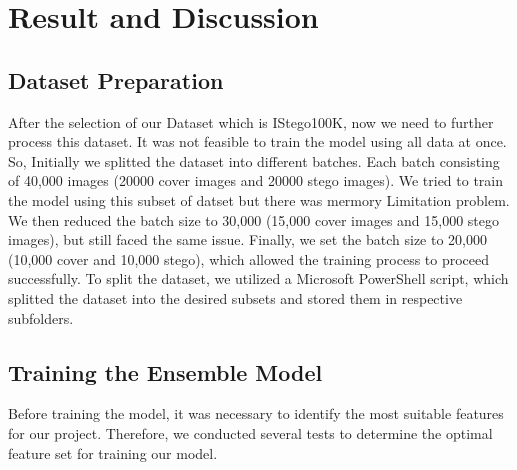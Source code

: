 \chapter{Result and Discussion}
\setcounter{secnumdepth}{4}
\section{Dataset Preparation}
After the selection of our Dataset which is IStego100K\cite{7}, now we need to further process this dataset. It was not feasible to train the model using all data at once. So, Initially we splitted the dataset into different batches. Each batch consisting of 40,000 images (20000 cover images and 20000 stego images). We tried to train the model using this subset of datset but there was mermory Limitation problem. We then reduced the batch size to 30,000 (15,000 cover images and 15,000 stego images), but still faced the same issue. Finally, we set the batch size to 20,000 (10,000 cover and 10,000 stego), which allowed the training process to proceed successfully. To split the dataset, we utilized a Microsoft PowerShell script, which splitted the dataset into the desired subsets and stored them in respective subfolders.\\
\section{Training the Ensemble Model}
Before training the model, it was necessary to identify the most suitable features for our project. Therefore, we conducted several tests to determine the optimal feature set for training our model.
